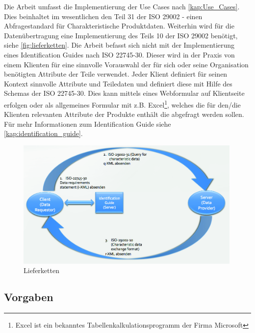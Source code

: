 Die Arbeit umfasst die Implementierung der Use Cases nach \autoref{kap:Use_Cases}. Dies beinhaltet im wesentlichen den Teil 31 der ISO 29002 - einen Abfragestandard für Charakteristische Produktdaten. 
Weiterhin wird für die Datenübertragung eine Implementierung des Teils 10 der ISO 29002 benötigt, siehe \autoref{fig:lieferketten}. 
Die Arbeit befasst sich nicht mit der Implementierung eines Identification Guides nach ISO 22745-30. Dieser wird in der Praxis von einem Klienten für eine sinnvolle Vorauswahl der für sich oder seine Organisation benötigten Attribute der Teile verwendet. Jeder Klient definiert für seinen Kontext sinnvolle Attribute und Teiledaten und definiert diese mit Hilfe des Schemas der ISO 22745-30. Dies kann mittels eines Webformular auf Klientseite erfolgen oder als allgemeines Formular mit z.B. Excel\footnote{Excel ist ein bekanntes Tabellenkalkulationsprogramm der Firma Microsoft}, welches die für den/die Klienten relevanten Attribute der Produkte enthält die abgefragt werden sollen. Für mehr Informationen zum Identification Guide siehe \autoref{kap:identification_guide}.

\begin{figure}[htbp]
	\centering
		\includegraphics[width=0.99\textwidth]{images/lieferketten_plib.jpg}
		\caption[Lieferketten]{Lieferketten\footnotemark}
	\label{fig:lieferketten}
\end{figure}

\subsection{Vorgaben}

